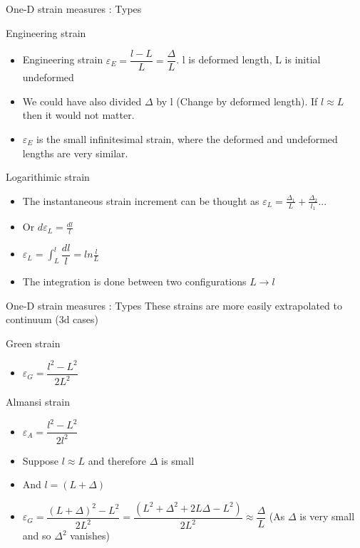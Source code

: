 	\begin{frame}{One-D strain measures : Types}
		\begin{block}{Engineering strain}
				\begin{itemize}
				\item Engineering strain $\varepsilon_E = \dfrac{l - L}{L} =\dfrac{\Delta }{L}$. l is deformed length, L is initial undeformed
				\item We could have also divided $\Delta$ by l (Change by deformed length). If $l \approx L$ then it would not matter.
				\item $\varepsilon_E $ is the small infinitesimal strain, where the deformed and undeformed lengths are very similar.			
			\end{itemize}
		\end{block}
		\begin{block}{Logarithimic strain}
			\begin{itemize}
			\item The instantaneous strain increment can be thought as $\varepsilon_L = \frac{\Delta_1}{L} + \frac{\Delta_2}{l_1} ...$
			\item Or $d\varepsilon_L = \frac{dl}{l}$  
			\item $\varepsilon_L = \int_{L}^{l}\dfrac{dl}{l} = ln \frac{l}{L}$
			\item The integration is done between two configurations $L \rightarrow l$
			\end{itemize}
		\end{block}	
	\end{frame}

	\begin{frame}{One-D strain measures : Types}
		These strains are more easily extrapolated to continuum (3d cases)
		\begin{block}{Green strain}
			\begin{itemize}
				\item $\varepsilon_G = \dfrac{l^2 - L^2}{2L^2}$ 			
			\end{itemize}
		\end{block}
		\begin{block}{Almansi strain}
			\begin{itemize}
				\item $\varepsilon_A = \dfrac{l^2 - L^2}{2l^2}$ 
			\end{itemize}
		\end{block}	
	
	\begin{itemize}
		\item Suppose $l \approx L$ and therefore $\Delta$ is small
		\item And $l = (L + \Delta)$
		\item $\varepsilon_G = \dfrac{(L + \Delta)^2 - L^2}{2L^2} = \dfrac{(L^2 + \Delta^2 + 2 L \Delta  - L^2)}{2L^2} \approx \dfrac{\Delta }{L}$ (As $\Delta$ is very small and so $\Delta^2$ vanishes)
		
	\end{itemize}
	\end{frame}

